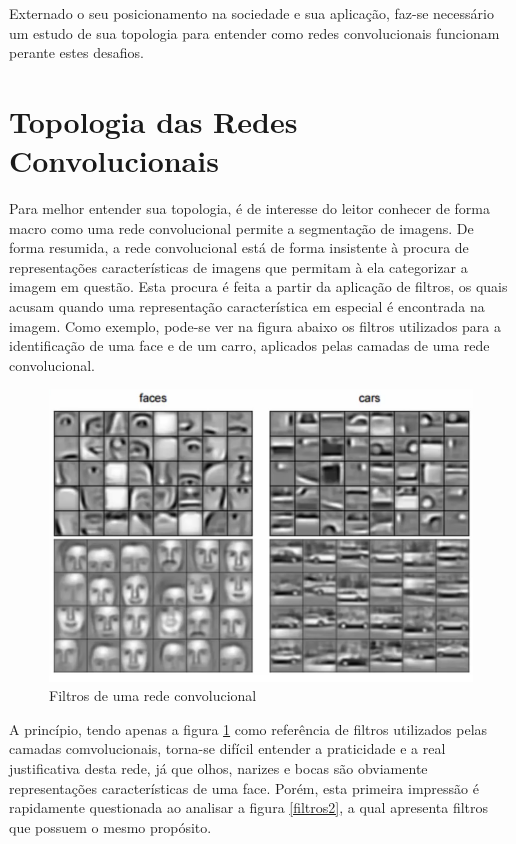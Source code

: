 \documentclass[
	12pt,				%
	oneside,			%
	a4paper,			%
	english,			%
	french,				%
	spanish,			%
	brazil,				%
	]{abntex2}
\begin{document}
Externado o seu posicionamento na sociedade e sua aplicação, faz-se necessário um estudo de sua topologia para entender como redes convolucionais funcionam perante estes desafios.

\section{Topologia das Redes Convolucionais}
Para melhor entender sua topologia, é de interesse do leitor conhecer de forma macro como uma rede convolucional permite a segmentação de imagens. De forma resumida, a rede convolucional está de forma insistente à procura de representações características de imagens que permitam à ela categorizar a imagem em questão. Esta procura é feita a partir da aplicação de filtros, os quais acusam quando uma representação característica em especial é encontrada na imagem. Como exemplo, pode-se ver na figura abaixo os filtros utilizados para a identificação de uma face e de um carro, aplicados pelas camadas de uma rede convolucional.

\begin{figure}[H]
	\centering
	\includegraphics[width=.8\textwidth]{imagens/filtros}
	\caption{Filtros de uma rede convolucional}
	\label{filtros}
\end{figure} 

A princípio, tendo apenas a figura \ref{filtros} como referência de filtros utilizados pelas camadas comvolucionais, torna-se difícil entender a praticidade e a real justificativa desta rede, já que olhos, narizes e bocas são obviamente representações características de uma face. Porém, esta primeira impressão é rapidamente questionada ao analisar a figura \ref{filtros2}, a qual apresenta filtros que possuem o mesmo propósito.
\end{document}
